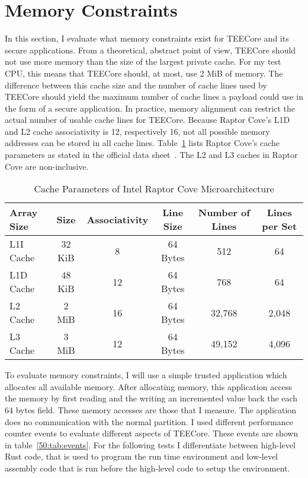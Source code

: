 \section{Memory Constraints}
\label{eval:mem_constraints}
In this section, I evaluate what memory constraints exist for TEECore and its
secure applications. From a theoretical, abstract point of view, TEECore should
not use more memory than the size of the largest private cache. For my test CPU,
this means that TEECore should, at most, use 2 MiB of memory. The difference
between this cache size and the number of cache lines used by TEECore should
yield the maximum number of cache lines a payload could use in the form of a
secure application. In practice, memory alignment can restrict the actual number
of usable cache lines for TEECore. Because Raptor Cove's L1D and L2 cache
associativity is 12, respectively 16, not all possible memory addresses can be
stored in all cache lines. Table~\ref{50:tab:cache_size} lists Raptor Cove's
cache parameters as stated in the official data
sheet~\cite{raptorlake_spec_sheet}. The L2 and L3 caches in Raptor Cove are
non-inclusive.\\

\begin{table}[ht]
  \centering
  \begin{tabular}{ |l||c|c|c|c|c| }
    \hline
    Array Size & Size   & Associativity   & Line Size & Number of Lines & Lines per Set \\
    \hline
    L1I Cache  & 32 KiB & 8               & 64 Bytes  & 512             & 64            \\
    L1D Cache  & 48 KiB & 12              & 64 Bytes  & 768             & 64            \\
    L2 Cache   & 2 MiB  & 16              & 64 Bytes  & 32,768          & 2,048         \\
    L3 Cache   & 3 MiB  & 12              & 64 Bytes  & 49,152          & 4,096         \\
    \hline
  \end{tabular}
  \caption{Cache Parameters of Intel Raptor Cove Microarchitecture}
  \label{50:tab:cache_size}
\end{table}

To evaluate memory constraints, I will use a simple trusted application which
allocates all available memory. After allocating memory, this application access
the memory by first reading and the writing an incremented value back the each
64 bytes field. These memory accesses are those that I measure. The application
does no communication with the normal partition. I used different performance
counter events to evaluate different aspects of TEECore. These events are shown
in table~\ref{50:tab:events}. For the following tests I differentiate between
high-level Rust code, that is used to program the run time environment and
low-level assembly code that is run before the high-level code to setup the
environment.


